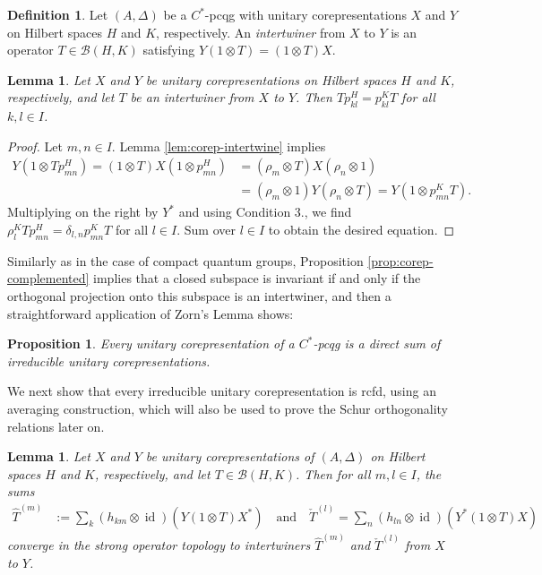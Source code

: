 \documentclass[11pt]{article}
\DeclareMathOperator{\id}{id}
\newtheorem{Lem}[Theorem]{Lemma}
\newtheorem{Prop}[Theorem]{Proposition}
\theoremstyle{definition}
\newtheorem{Def}[Theorem]{Definition}
\numberwithin{equation}{section}
\begin{document}
\begin{Def}
  Let $(A,\Delta)$ be a $C^{*}$-pcqg with unitary corepresentations
  $X$ and $Y$ on Hilbert spaces $H$ and $K$, respectively. An
  \emph{intertwiner} from $X$ to $Y$ is an operator $T\in
  \mathcal{B}(H,K)$ satisfying $Y(1\otimes T)=(1 \otimes T)X$.
\end{Def}
\begin{Lem} \label{lem:intertwiner-graded}
  Let $X$ and $Y$ be unitary corepresentations on Hilbert spaces $H$ and $K$, respectively, and let
  $T$ be an \emph{intertwiner} from $X$ to $Y$. Then $Tp^{H}_{kl} = p^{K}_{kl}T$ for all $k,l\in I$.
\end{Lem}
\begin{proof}
Let $m,n\in I$. Lemma \ref{lem:corep-intertwine} implies
\begin{align*}
  Y(1\otimes Tp^{H}_{mn}) = (1\otimes T)X(1\otimes p^{H}_{mn}) &= (\rho_{m} \otimes T)X(\rho_{n}
  \otimes 1) \\ &= (\rho_{m} \otimes 1)Y( \rho_{n}\otimes T) = Y(1 \otimes p^{K}_{mn}T).
\end{align*}
Multiplying on the right by $Y^{*}$ and using Condition 3., we find
$\rho^{K}_{l}Tp^{H}_{mn}  = \delta_{l,n} p^{K}_{mn}T$ for all $l \in I$. Sum over $l\in I$ to obtain
the desired equation.
\end{proof}
Similarly as in the case of compact quantum groups, Proposition \ref{prop:corep-complemented} implies
that a closed subspace is invariant if and only if the orthogonal
projection onto this subspace is an intertwiner, and then a
straightforward application of Zorn's Lemma shows:
\begin{Prop}
  Every unitary corepresentation of a $C^{*}$-pcqg is a direct sum of
  irreducible unitary corepresentations.
\end{Prop}
We next show that every irreducible unitary corepresentation
is rcfd, using an averaging construction, which
will also be used to prove the Schur orthogonality relations later on.
\begin{Lem} \label{lem:intertwiner-averaged}
  Let $X$ and $Y$ be unitary corepresentations of $(A,\Delta)$ on Hilbert spaces $H$ and $K$,
  respectively, and let $T \in \mathcal{B}(H,K)$. Then for all $m,l \in I$, the sums
  \begin{align*}
    \hat T^{(m)} &:= \sum_{k} (h_{km} \otimes \id)(Y(1 \otimes T)X^{*}) \quad \text{and} \quad
    \check T^{(l)}=\sum_{n} (h_{ln}\otimes \id)(Y^{*}(1 \otimes T)X)
  \end{align*}
converge in the strong operator topology to intertwiners $\hat T^{(m)}$ and $\check T^{(l)}$ from $X$ to
$Y$.
\end{Lem}
\end{document}
